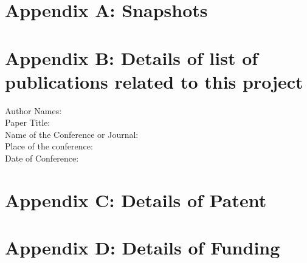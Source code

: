 \appendix
\renewcommand{\thechapter}{\Alph{chapter}}
\renewcommand{\thesection}{\Roman{section}}
\section {Appendix A: Snapshots}
\clearpage
\section {Appendix B: Details of list of publications related to this project}
\large{Author Names: } \\
\large{Paper Title: } \\
\large {Name of the Conference or Journal:} \\
\large {Place of the conference:}\\ 
\large {Date of Conference:}
\clearpage
\section {Appendix C: Details of Patent}
\clearpage
\section {Appendix D: Details of Funding}
\clearpage

